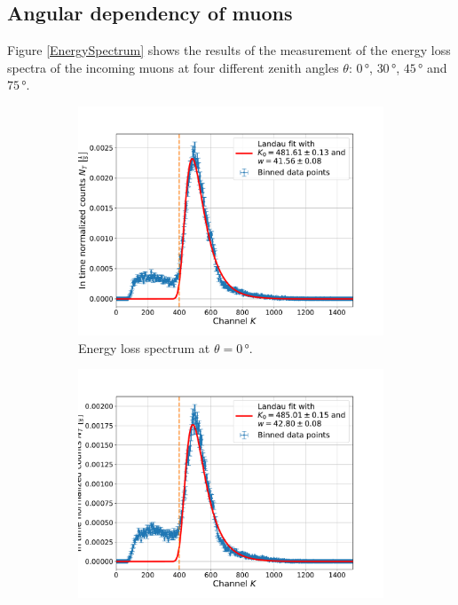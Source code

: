 \subsection{Angular dependency of muons}

Figure \ref{EnergySpectrum} shows the results of the measurement of the energy loss spectra of the incoming muons at four different zenith angles $\theta$: $0\,$°, $30\,$°, $45\,$° and $75\,$°.
\begin{figure}[H]
	\centering
	\begin{subfigure}[t]{0.495\textwidth}
		\centering
		\includegraphics[width=\textwidth]{src/EnergySpectrumAt0Degrees}
		\caption{Energy loss spectrum at $\theta =0\,$°.}
		\label{EnergySpectrumAt0Degrees}
	\end{subfigure}
	\begin{subfigure}[t]{0.495\textwidth}
		\centering
		\includegraphics[width=\textwidth]{src/EnergySpectrumAt30Degrees}

\end{subfigure}
\end{figure}
